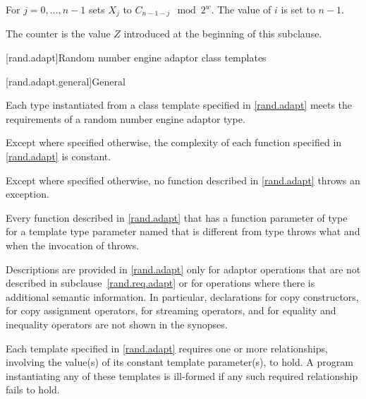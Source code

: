 \begin{itemdescr}
\pnum
\effects
For $j = 0, \dotsc, n - 1$ sets $X_j$ to $C_{n - 1 - j} \mod 2^w$.
The value of $i$ is set to $n - 1$.
\begin{note}
The counter is the value $Z$ introduced at the beginning of this subclause.
\end{note}
\end{itemdescr}



[rand.adapt]{Random number engine adaptor class templates}

[rand.adapt.general]{General}

\pnum
Each type instantiated
from a class template specified in \ref{rand.adapt}
meets the requirements
of a random number engine adaptor type.

\pnum
Except where specified otherwise,
the complexity of each function
specified in \ref{rand.adapt}
is constant.

\pnum
Except where specified otherwise,
no function described in \ref{rand.adapt}
throws an exception.

\pnum
Every function described in \ref{rand.adapt}
that has a function parameter  of type 
for a template type parameter named 
that is different from type 
throws what and when the invocation of  throws.

\pnum
Descriptions are provided in \ref{rand.adapt}
only for adaptor operations
that are not described in subclause~\ref{rand.req.adapt}
or for operations where there is additional semantic information.
In particular,
declarations for copy constructors,
for copy assignment operators,
for streaming operators,
and for equality and inequality operators
are not shown in the synopses.

\pnum
Each template specified in \ref{rand.adapt}
requires one or more relationships,
involving the value(s) of its constant template parameter(s), to hold.
A program instantiating any of these templates
is ill-formed
if any such required relationship fails to hold.


